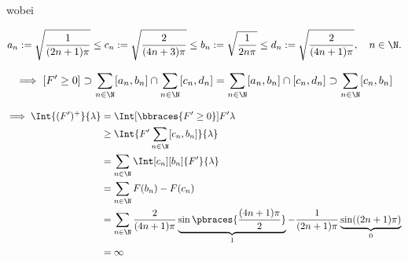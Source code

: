 \begin{solution}
\begin{enumerate}[label = \arabic*.]
    wobei

    \begin{align*}
        a_n := \sqrt{\frac{1}{(2 n + 1) \pi}}
        \leq
        c_n := \sqrt{\frac{2}{(4 n + 3) \pi}}
        \leq
        b_n := \sqrt{\frac{1}{2 n \pi}}
        \leq
        d_n := \sqrt{\frac{2}{(4 n + 1) \pi}},
        \quad
        n \in \N.
    \end{align*}

    \begin{align*}
        \implies
        [F^\prime \geq 0]
        \supset
        \sum_{n \in \N}
            [a_n, b_n]
        \cap
        \sum_{n \in \N}
            [c_n, d_n]
        =
        \sum_{n \in \N}
            [a_n, b_n]
            \cap
            [c_n, d_n]
        \supset
        \sum_{n \in \N}
            [c_n, b_n]
    \end{align*}

    \begin{align*}
        \implies
        \Int{(F^\prime)^+}{\lambda}
        & =
        \Int[\bbraces{F^\prime \geq 0}]{F^\prime}{\lambda} \\
        & \geq
        \Int
        {
            F^\prime
            \sum_{n \in \N}
                [c_n, b_n]
        }{\lambda} \\
        & =
        \sum_{n \in \N}
        \Int[c_n][b_n]
        {
            F^\prime
        }{\lambda} \\
        & =
        \sum_{n \in \N}
            F(b_n) - F(c_n) \\
        & =
        \sum_{n \in \N}
            \frac{2}{(4 n + 1) \pi}
            \underbrace
            {
                \sin \pbraces
                {
                    \frac{(4 n + 1) \pi}{2}
                }
            }_1
            -
            \frac{1}{(2 n + 1) \pi}
            \underbrace
            {
                \sin((2 n + 1) \pi)
            }_0 \\
        & =
        \infty
    \end{align*}

\end{enumerate}

\end{solution}

